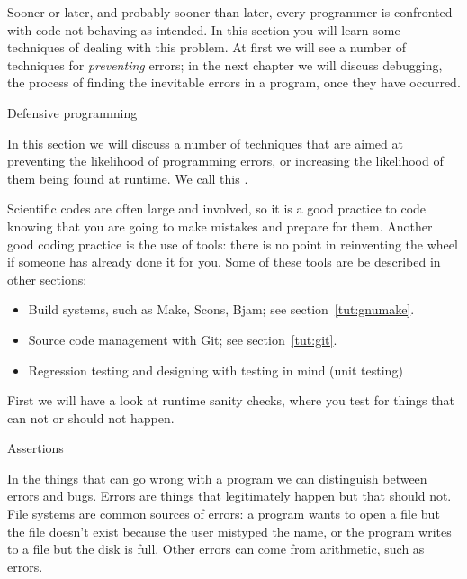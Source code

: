 
Sooner or later, and probably sooner than later, every programmer is
confronted with code not behaving as intended. In this section you
will learn some techniques of dealing with this problem. At first we
will see a number of techniques for \emph{preventing} errors; 
in the next chapter we will discuss debugging, the process of
finding the inevitable errors in a program, once they have occurred.

 {Defensive programming}

In this section we will discuss a number of  techniques
that are aimed at preventing the likelihood of programming errors, or
increasing the likelihood of them being found at runtime.
We call this  . 

Scientific codes are often large and involved, so it
is a good practice to code knowing that you are going to make mistakes
and prepare for them. Another good coding practice is the use of
tools: there is no point in reinventing the wheel if someone has
already done it for you. Some of these tools are be described in
other sections:
\begin{itemize}
\item Build systems, such as Make, Scons, Bjam; see section~\ref{tut:gnumake}.
\item Source code management with Git; see section~\ref{tut:git}.
\item Regression testing and designing with testing in mind (unit testing)
\end{itemize}

First we will have a look at runtime sanity checks, where you test 
for things that can not or should not
happen. 

 {Assertions}

In the things that can go wrong with a program we can distinguish between
errors and bugs. Errors are things that legitimately happen but that should
not. File systems are common sources of errors: a program wants to open a file but
the file doesn't exist because the user mistyped the name, or the program
writes to a file but the disk is full. Other errors can come from arithmetic,
such as  errors.

